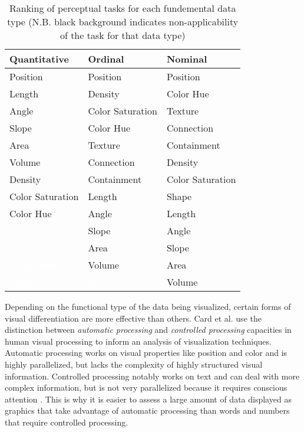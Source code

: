 \begin{table}
    \begin{center}
    \begin{tabular}{ | l | l | l | }
    \hline
    Quantitative & Ordinal & Nominal \\ \hline
    Position & Position & Position \\
    Length & Density & Color Hue \\
    Angle & Color Saturation & Texture \\
    Slope & Color Hue & Connection \\
    Area & Texture & Containment \\
    Volume & Connection & Density \\
    Density & Containment & Color Saturation \\
    Color Saturation & Length & Shape \\
    Color Hue & Angle & Length \\
    \cellcolor{black}\textcolor{white}{Texture} & Slope & Angle \\
    \cellcolor{black}\textcolor{white}{Connection} & Area & Slope \\
    \cellcolor{black}\textcolor{white}{Containment} & Volume & Area \\
    \cellcolor{black}\textcolor{white}{Shape} & \cellcolor{black}\textcolor{white}{Shape} & Volume \\
    \hline
    \end{tabular}
    \end{center}
    \caption{Ranking of perceptual tasks for each fundemental data type (N.B. black background indicates non-applicability of the task for that data type)}
    \label{tab:perceptual}
\end{table}

Depending on the functional type of the data being visualized, certain forms of visual differentiation are more effective than others. Card et al. \cite{card1997} use the distinction between \emph{automatic processing} and \emph{controlled processing} capacities in human visual processing to inform an analysis of visualization techniques. Automatic processing works on visual properties like position and color and is highly parallelized, but lacks the complexity of highly structured visual information. Controlled processing notably works on text and can deal with more complex information, but is not very parallelized because it requires conscious attention \cite{controlauto1977}. This is why it is easier to assess a large amount of data displayed as graphics that take advantage of automatic processing than words and numbers that require controlled processing.

